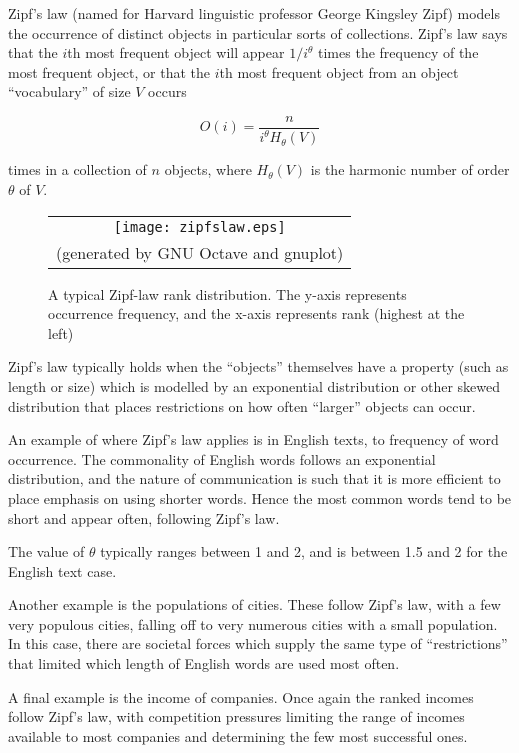 \documentclass[12pt]{article}
\begin{document}
Zipf's law (named for Harvard linguistic professor George Kingsley Zipf) models the occurrence of distinct objects in particular sorts of collections.    Zipf's law says that the $i$th most frequent object will appear $1/i^\theta$ times the frequency of the most frequent object, or that the $i$th most frequent object from an object ``vocabulary'' of size $V$ occurs

$$ O(i) = \frac{n}{i^{\theta} H_{\theta}(V) } $$

times in a collection of $n$ objects, where $H_{\theta}(V)$ is the harmonic number of order $\theta$ of $V$.

\begin{center}
  \begin{figure}
  \begin{tabular}{c}
  \texttt{[image: zipfslaw.eps]} \\
  {\tiny (generated by GNU Octave and gnuplot) }
  \end{tabular}
    \caption{A typical Zipf-law rank distribution.  The y-axis represents occurrence frequency, and the x-axis represents rank (highest at the left)}
  \end{figure}
\end{center}

Zipf's law typically holds when the ``objects'' themselves have a property (such as length or size) which is modelled by an exponential distribution or other skewed distribution that places restrictions on how often ``larger'' objects can occur.

An example of where Zipf's law applies is in English texts, to frequency of word occurrence.  The commonality of English words follows an exponential distribution,  and the nature of communication is such that it is more efficient to place emphasis on using shorter words.  Hence the most common words tend to be short and appear often, following Zipf's law.

The value of $\theta$ typically ranges between 1 and 2, and is between 1.5 and 2 for the English text case.

Another example is the populations of cities.  These follow Zipf's law, with a few very populous cities, falling off to very numerous cities with a small population.  In this case, there are societal forces which supply the same type of ``restrictions'' that limited which length of English words are used most often.

A final example is the income of companies.  Once again the ranked incomes follow Zipf's law, with competition pressures limiting the range of incomes available to most companies and determining the few most successful ones.
\end{document}
